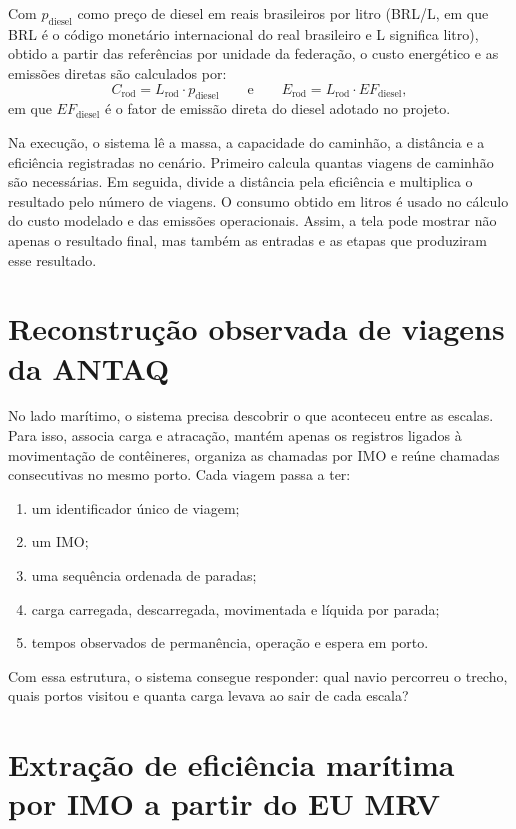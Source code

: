 \documentclass[12pt,a4paper]{report}
\begin{document}
Com \(p_{\text{diesel}}\) como preço de diesel em reais brasileiros por litro (BRL/L, em que BRL é o código monetário internacional do real brasileiro e L significa litro), obtido a partir das referências por unidade da federação, o custo energético e as emissões diretas são calculados por:
\begin{equation}
C_{\text{rod}} = L_{\text{rod}} \cdot p_{\text{diesel}}
\qquad\text{e}\qquad
E_{\text{rod}} = L_{\text{rod}} \cdot EF_{\text{diesel}},
\label{eq:road-cost-emissions}
\end{equation}
em que \(EF_{\text{diesel}}\) é o fator de emissão direta do diesel adotado no projeto.

Na execução, o sistema lê a massa, a capacidade do caminhão, a distância e a eficiência registradas no cenário. Primeiro calcula quantas viagens de caminhão são necessárias. Em seguida, divide a distância pela eficiência e multiplica o resultado pelo número de viagens. O consumo obtido em litros é usado no cálculo do custo modelado e das emissões operacionais. Assim, a tela pode mostrar não apenas o resultado final, mas também as entradas e as etapas que produziram esse resultado.

\section{Reconstrução observada de viagens da ANTAQ}

No lado marítimo, o sistema precisa descobrir o que aconteceu entre as escalas. Para isso, associa carga e atracação, mantém apenas os registros ligados à movimentação de contêineres, organiza as chamadas por IMO e reúne chamadas consecutivas no mesmo porto. Cada viagem passa a ter:

\begin{enumerate}
  \item um identificador único de viagem;
  \item um IMO;
  \item uma sequência ordenada de paradas;
  \item carga carregada, descarregada, movimentada e líquida por parada;
  \item tempos observados de permanência, operação e espera em porto.
\end{enumerate}

Com essa estrutura, o sistema consegue responder: qual navio percorreu o trecho, quais portos visitou e quanta carga levava ao sair de cada escala?

\section{Extração de eficiência marítima por IMO a partir do EU MRV}
\end{document}
